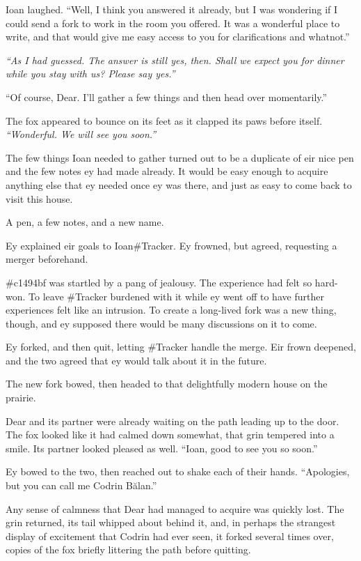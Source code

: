 Ioan laughed. ``Well, I think you answered it already, but I was wondering if I could send a fork to work in the room you offered. It was a wonderful place to write, and that would give me easy access to you for clarifications and whatnot.''

\emph{``As I had guessed. The answer is still yes, then. Shall we expect you for dinner while you stay with us? Please say yes.''}

``Of course, Dear. I'll gather a few things and then head over momentarily.''

The fox appeared to bounce on its feet as it clapped its paws before itself. \emph{``Wonderful. We will see you soon.''}

The few things Ioan needed to gather turned out to be a duplicate of eir nice pen and the few notes ey had made already. It would be easy enough to acquire anything else that ey needed once ey was there, and just as easy to come back to visit this house.

A pen, a few notes, and a new name.

Ey explained eir goals to Ioan\#Tracker. Ey frowned, but agreed, requesting a merger beforehand.

\#c1494bf was startled by a pang of jealousy. The experience had felt so hard-won. To leave \#Tracker burdened with it while ey went off to have further experiences felt like an intrusion. To create a long-lived fork was a new thing, though, and ey supposed there would be many discussions on it to come.

Ey forked, and then quit, letting \#Tracker handle the merge. Eir frown deepened, and the two agreed that ey would talk about it in the future.

The new fork bowed, then headed to that delightfully modern house on the prairie.

Dear and its partner were already waiting on the path leading up to the door. The fox looked like it had calmed down somewhat, that grin tempered into a smile. Its partner looked pleased as well. ``Ioan, good to see you so soon.''

Ey bowed to the two, then reached out to shake each of their hands. ``Apologies, but you can call me Codrin Bălan.''

Any sense of calmness that Dear had managed to acquire was quickly lost. The grin returned, its tail whipped about behind it, and, in perhaps the strangest display of excitement that Codrin had ever seen, it forked several times over, copies of the fox briefly littering the path before quitting.

